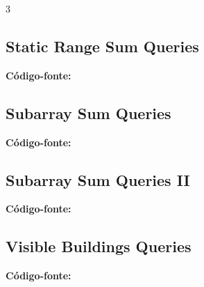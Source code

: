 \documentclass[8pt]{extarticle}
\begin{document}
\begin{multicols*}{3}
\subsection{Static Range Sum Queries}
\begin{caixaenunciado}

\end{caixaenunciado}
\vspace{0.3cm}
\noindent\textbf{Código-fonte:}


\subsection{Subarray Sum Queries}
\begin{caixaenunciado}

\end{caixaenunciado}
\vspace{0.3cm}
\noindent\textbf{Código-fonte:}


\subsection{Subarray Sum Queries II}
\begin{caixaenunciado}

\end{caixaenunciado}
\vspace{0.3cm}
\noindent\textbf{Código-fonte:}


\subsection{Visible Buildings Queries}
\begin{caixaenunciado}

\end{caixaenunciado}
\vspace{0.3cm}
\noindent\textbf{Código-fonte:}

\end{multicols*}
\pagebreak
\end{document}
